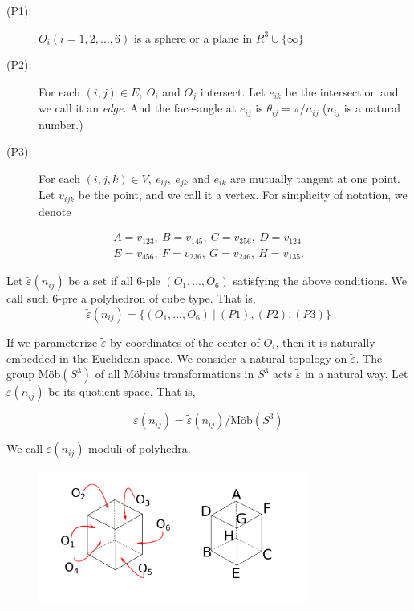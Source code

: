 \documentclass[suppldata, dvipdfmx]{interact}
\theoremstyle{plain}%
\theoremstyle{definition}
\theoremstyle{remark}
\theoremstyle{problemstyle}
\begin{document}
\begin{description}
 \item[(P1):] $O_i(i = 1, 2, ..., 6)$ is a sphere or a plane in $R^3
            \cup \{\infty\}$
 \item[(P2):] For each $(i, j) \in E,~O_i$ and $O_j$ intersect. Let
            $e_{ik}$ be the intersection and we call it an
            \textit{edge}. And the face-angle at $e_{ij}$ is
            $\theta_{ij} = \pi/n_{ij}$ ($n_{ij}$ is a natural number.)
 \item[(P3):] For each $(i, j, k) \in V,~e_{ij},~e_{jk}$ and $e_{ik}$
            are mutually tangent at one point. Let $v_{ijk}$ be 
            the point, and we call it a vertex. For simplicity of
            notation, we denote
\end{description}
\begin{eqnarray*}
A = v_{123},~B=v_{145},~C = v_{356},~D = v_{124}\\
E = v_{456},~F=v_{236},~G = v_{246},~H = v_{135}.
\end{eqnarray*}

Let $\tilde\varepsilon(n_{ij})$ be a set if all 6-ple $(O_1, ..., O_6)$
satisfying the above conditions. We call such 6-pre a polyhedron of
cube type. That is,
$$
\tilde\varepsilon(n_{ij}) = \{(O_1, ..., O_6)~|~(P1), (P2), (P3)\}
$$

If we parameterize $\tilde\varepsilon$ by coordinates of the center of
$O_i$, then it is naturally embedded in the Euclidean space. We consider
a natural topology on $\tilde\varepsilon$. The group M\"ob$(S^3)$ of all
M\"obius transformations in $S^3$ acts $\tilde\varepsilon$ in a natural way.
Let $\varepsilon(n_{ij})$ be its quotient space. That is,

$$
\varepsilon (n_{ij}) = \tilde\varepsilon(n_{ij}) / \text{M\"ob}(S^3)
$$

\noindent We call $\varepsilon(n_{ij})$ moduli of polyhedra.

\begin{figure}[h!tbp]
 \centering
 \includegraphics[width=3.5in,
 keepaspectratio]{./img/HexahedraWithSphericalFaces/cubes.png}
 \caption{}
 \label{fig:cubes}
\end{figure}
\end{document}
